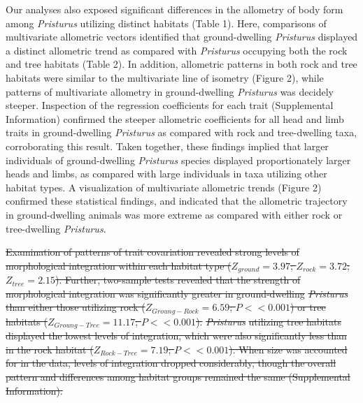 \documentclass[
  11pt,
]{article}
\providecommand{\DIFdeltex}[1]{{\protect\color{red}\sout{#1}}}                      %
\providecommand{\DIFdelbegin}{} %
\providecommand{\DIFdel}[1]{\texorpdfstring{\DIFdeltex{#1}}{}} %
\newcommand{\DIFscaledelfig}{0.5}
\newlength{\DIFdelgraphicswidth} %
\newlength{\DIFdelgraphicsheight} %
\newcommand{\DIFdelincludegraphics}[2][]{%
\sbox{\DIFdelgraphicsbox}{\DIFOincludegraphics[#1]{#2}}%
\settoboxwidth{\DIFdelgraphicswidth}{\DIFdelgraphicsbox} %
\settoboxtotalheight{\DIFdelgraphicsheight}{\DIFdelgraphicsbox} %
\scalebox{\DIFscaledelfig}{%
\parbox[b]{\DIFdelgraphicswidth}{\usebox{\DIFdelgraphicsbox}\\[-\baselineskip] \rule{\DIFdelgraphicswidth}{0em}}\llap{\resizebox{\DIFdelgraphicswidth}{\DIFdelgraphicsheight}{%
\setlength{\unitlength}{\DIFdelgraphicswidth}%
\begin{picture}(1,1)%
\thicklines\linethickness{2pt} %
{\color[rgb]{1,0,0}\put(0,0){\framebox(1,1){}}}%
{\color[rgb]{1,0,0}\put(0,0){\line( 1,1){1}}}%
{\color[rgb]{1,0,0}\put(0,1){\line(1,-1){1}}}%
\end{picture}%
}\hspace*{3pt}}} %
} %
\DeclareRobustCommand{\DIFdelbegin}{\DIFOdelbegin \let\includegraphics\DIFdelincludegraphics} %
\begin{document}
Our analyses also exposed significant differences in the allometry of
body form among \emph{Pristurus} utilizing distinct habitats (Table 1).
Here, comparisons of multivariate allometric vectors identified that
ground-dwelling \emph{Pristurus} displayed a distinct allometric trend
as compared with \emph{Pristurus} occupying both the rock and tree
habitats (Table 2). In addition, allometric patterns in both rock and
tree habitats were similar to the multivariate line of isometry (Figure
2), while patterns of multivariate allometry in ground-dwelling
\emph{Pristurus} was decidely steeper. Inspection of the regression
coefficients for each trait (Supplemental Information) confirmed the
steeper allometric coefficients for all head and limb traits in
ground-dwelling \emph{Pristurus} as compared with rock and tree-dwelling
taxa, corroborating this result. Taken together, these findings implied
that larger individuals of ground-dwelling \emph{Pristurus} species
displayed proportionately larger heads and limbs, as compared with large
individuals in taxa utilizing other habitat types. A visualization of
multivariate allometric trends (Figure 2) confirmed these statistical
findings, and indicated that the allometric trajectory in
ground-dwelling animals was more extreme as compared with either rock or
tree-dwelling \emph{Pristurus}. \hfill\break

\DIFdelbegin \DIFdel{Examination of patterns of trait covariation revealed strong levels of
morphological integration within each habitat type (\(Z_{ground}=3.97\);
\(Z_{rock}=3.72\); \(Z_{tree}=2.15\)). Further, two-sample tests
revealed that the strength of morphological integration was
significantly greater in ground-dwelling }\emph{\DIFdel{Pristurus}} %
\DIFdel{than either
those utilizing rock (\(Z_{Groung-Rock}=6.59\); \(P << 0.001\)) or tree
habitats (\(Z_{Groung-Tree}=11.17\); \(P << 0.001\)). }\emph{\DIFdel{Pristurus}}
\DIFdel{utilizing tree habitats displayed the lowest levels of integration,
which were also significantly less than in the rock habitat
(\(Z_{Rock-Tree}=7.19\); \(P << 0.001\)). When size was accounted for in
the data, levels of integration dropped considerably, though the overall
pattern and differences among habitat groups remained the same
(Supplemental Information). }%
\end{document}
